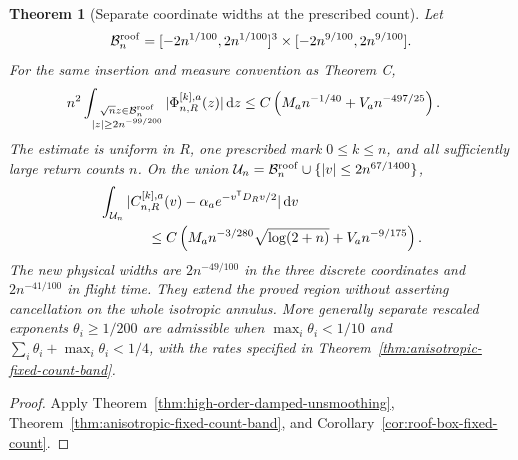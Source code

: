 \documentclass[11pt,reqno]{amsart}
\numberwithin{equation}{section}
\newtheorem{maintheorem}{Theorem}
\theoremstyle{definition}\newtheorem{definition}[theorem]{Definition}
\theoremstyle{remark}\newtheorem{remark}[theorem]{Remark}
\newcommand{\dd}{\,\mathrm d}\newcommand{\one}{\mathbf1}
\begin{document}
\begin{maintheorem}[Separate coordinate widths at the prescribed count]
\label{thm:intro-anisotropic-band}
Let
\[
 \mathcal B_n^{\rm roof}
   =[-2n^{1/100},2n^{1/100}]^3
                         \times[-2n^{9/100},2n^{9/100}].
\]
For the same insertion and measure convention as Theorem C,
\begin{align*}
 &n^2\int_{\substack{\sqrt n z\in\mathcal B_n^{\rm roof}\\
                            |z|\ge2n^{-99/200}}}
                  |\Phi^{[k],a}_{n,R}(z)|\dd z
       \le C\left(M_an^{-1/40}+V_an^{-497/25}\right).
\end{align*}
The estimate is uniform in $R$, one prescribed mark $0\le k\le n$,
and all sufficiently large return counts $n$. On the union
$\mathcal U_n=\mathcal B_n^{\rm roof}\cup\{|v|\le2n^{67/1400}\}$,
\begin{align*}
 &\int_{\mathcal U_n}
 |C^{[k],a}_{n,R}(v)-\alpha_a e^{-v^{\mathsf T}D_Rv/2}|\dd v\\
 &\hspace{12mm}\le C\left(M_an^{-3/280}\sqrt{\log(2+n)}
                                      +V_an^{-9/175}\right).
\end{align*}
The new physical widths are $2n^{-49/100}$ in the three discrete
coordinates and $2n^{-41/100}$ in flight time. They extend the proved
region without asserting cancellation on the whole isotropic annulus.
More generally separate rescaled exponents $\theta_i\ge1/200$ are
admissible when $\max_i\theta_i<1/10$ and
$\sum_i\theta_i+\max_i\theta_i<1/4$, with the rates specified in
Theorem~\ref{thm:anisotropic-fixed-count-band}.
\end{maintheorem}
\begin{proof}
Apply Theorem~\ref{thm:high-order-damped-unsmoothing},
Theorem~\ref{thm:anisotropic-fixed-count-band}, and
Corollary~\ref{cor:roof-box-fixed-count}.
\end{proof}
\end{document}
